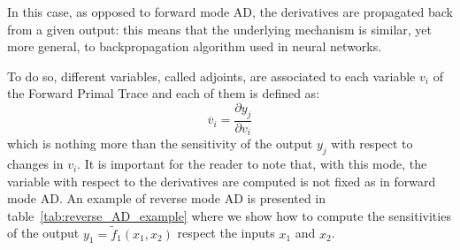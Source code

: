 In this case, as opposed to forward mode AD, the derivatives are propagated back from a given output: this means that the underlying mechanism is similar, yet more general, to backpropagation algorithm used in neural networks.

To do so, different variables, called adjoints, are associated to each variable $v_i$ of the Forward Primal Trace and each of them is defined as:
\[
\overline{v}_i = \frac{\partial y_j}{\partial v_i}
\]
which is nothing more than the sensitivity of the output $y_j$ with respect to changes in $v_i$. It is important for the reader to note that, with this mode, the variable with respect to the derivatives are computed is not fixed as in forward mode AD. An example of reverse mode AD is presented in table~\ref{tab:reverse_AD_example} where we show how to compute the sensitivities of the output $y_1 = \tilde{f}_1(x_1, x_2)$ respect the inputs $x_1$ and $x_2$.

